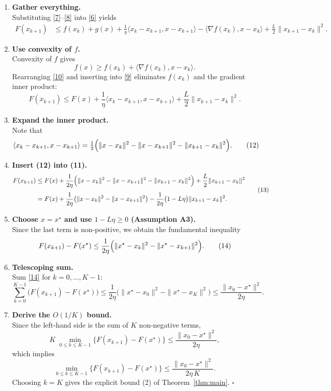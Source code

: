 \documentclass{article}
\newcommand{\grad}{\nabla}
\begin{document}
\begin{enumerate}[label=[Step \arabic*],leftmargin=*,itemsep=1ex]
\item \textbf{Gather everything.}\\
Substituting \eqref{7}–\eqref{8} into \eqref{6} yields
\[
\begin{aligned}
F(x_{k+1}) &\le f(x_{k})+g(x)
+\frac{1}{\eta}\langle x_{k}-x_{k+1},x-x_{k+1}\rangle
-\langle\grad f(x_{k}),x-x_{k}\rangle
+\frac{L}{2}\|x_{k+1}-x_{k}\|^{2}.
\end{aligned}
\tag{9}
\]

\item \textbf{Use convexity of $f$.}\\
Convexity of $f$ gives
\[
f(x)\ge f(x_{k})+\langle\grad f(x_{k}),x-x_{k}\rangle .
\tag{10}
\]
Rearranging \eqref{10} and inserting into \eqref{9} eliminates $f(x_{k})$ and the gradient inner product:
\[
F(x_{k+1})\le F(x)+\frac{1}{\eta}\langle x_{k}-x_{k+1},x-x_{k+1}\rangle
+\frac{L}{2}\|x_{k+1}-x_{k}\|^{2}.
\tag{11}
\]

\item \textbf{Expand the inner product.}\\
Note that
\[
\langle x_{k}-x_{k+1},x-x_{k+1}\rangle
= \tfrac12\Bigl(\|x-x_{k}\|^{2}-\|x-x_{k+1}\|^{2}
-\|x_{k+1}-x_{k}\|^{2}\Bigr).
\tag{12}
\]

\item \textbf{Insert (12) into (11).}\\
\[
\begin{aligned}
F(x_{k+1}) &\le F(x)
+\frac{1}{2\eta}\Bigl(\|x-x_{k}\|^{2}-\|x-x_{k+1}\|^{2}
-\|x_{k+1}-x_{k}\|^{2}\Bigr)
+\frac{L}{2}\|x_{k+1}-x_{k}\|^{2}\\[0.3em]
&= F(x)+\frac{1}{2\eta}\bigl(\|x-x_{k}\|^{2}-\|x-x_{k+1}\|^{2}\bigr)
-\frac{1}{2\eta}\bigl(1-L\eta\bigr)\|x_{k+1}-x_{k}\|^{2}.
\end{aligned}
\tag{13}
\]

\item \textbf{Choose $x=x^{\star}$ and use $1-L\eta\ge0$ (Assumption A3).}\\
Since the last term is non‑positive, we obtain the fundamental inequality
\[
F(x_{k+1})-F(x^{\star})
\le \frac{1}{2\eta}\Bigl(\|x^{\star}-x_{k}\|^{2}
-\|x^{\star}-x_{k+1}\|^{2}\Bigr).
\tag{14}
\]

\item \textbf{Telescoping sum.}\\
Sum \eqref{14} for $k=0,\dots,K-1$:
\[
\sum_{k=0}^{K-1}\bigl(F(x_{k+1})-F(x^{\star})\bigr)
\le \frac{1}{2\eta}\bigl(\|x^{\star}-x_{0}\|^{2}
-\|x^{\star}-x_{K}\|^{2}\bigr)
\le \frac{\|x_{0}-x^{\star}\|^{2}}{2\eta}.
\tag{15}
\]

\item \textbf{Derive the $O(1/K)$ bound.}\\
Since the left‑hand side is the sum of $K$ non‑negative terms,
\[
K\;\min_{0\le k\le K-1}\bigl\{F(x_{k+1})-F(x^{\star})\bigr\}
\le \frac{\|x_{0}-x^{\star}\|^{2}}{2\eta},
\]
which implies
\[
\min_{0\le k\le K-1}\bigl\{F(x_{k+1})-F(x^{\star})\bigr\}
\le \frac{\|x_{0}-x^{\star}\|^{2}}{2\eta\,K}.
\tag{16}
\]
Choosing $k=K$ gives the explicit bound (2) of Theorem~\ref{thm:main}.
\hfill $\square$
\end{enumerate}
\end{document}
